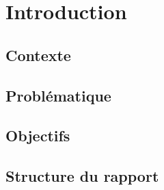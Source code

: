 \section{Introduction}
\label{sec:introduction}

\subsection{Contexte}

\subsection{Problématique}

\subsection{Objectifs}

\subsection{Structure du rapport}
